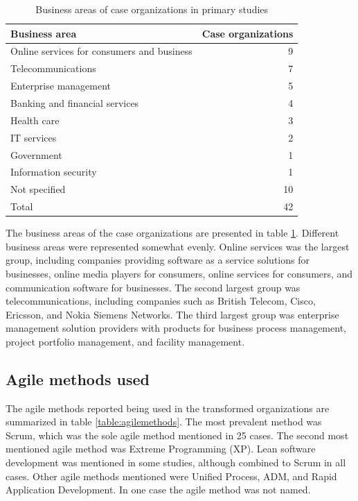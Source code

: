 \begin{table}[!t]
    \centering
    \begin{tabular}{ l r }
        \toprule
        Business area    &  Case organizations   \\
        \midrule
		Online services for consumers and business  &  9  \\
		Telecommunications                          &  7  \\
		Enterprise management                       &  5  \\
		Banking and financial services              &  4  \\
		Health care                                  &  3  \\
		IT services                                 &  2  \\
		Government                                  &  1  \\
		Information security                        &  1  \\
		Not specified                               & 10  \\
        \midrule
		Total                                       & 42  \\
        \bottomrule
    \end{tabular}
    \caption{Business areas of case organizations in primary studies}
    \label{table:businessareas}
\end{table}

The business areas of the case organizations are presented in table
\ref{table:businessareas}. Different business areas were represented somewhat
evenly. Online services was the largest group, including companies
providing software as a service solutions for businesses, online media players
for consumers, online services for consumers, and communication software for
businesses. The second largest group was telecommunications, including companies
such as British Telecom, Cisco, Ericsson, and Nokia Siemens Networks. The third
largest group was enterprise management solution providers with products for
business process management, project portfolio management, and facility
management.


\subsection{Agile methods used}

The agile methods reported being used in the transformed organizations are
summarized in table \ref{table:agilemethods}. The most prevalent method was
Scrum, which was the sole agile method mentioned in 25 cases. The second most
mentioned agile method was Extreme Programming (XP). Lean software development
was mentioned in some studies, although combined to Scrum in all cases. Other
agile methods mentioned were Unified Process, ADM, and Rapid Application
Development. In one case the agile method was not named.

